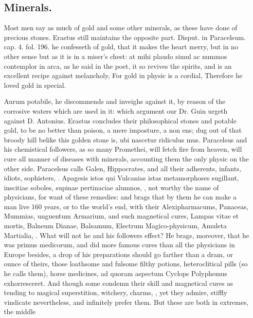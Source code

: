 {\subsection{Minerals.}
Most men say as much of gold and some other minerals, as
these have done of precious stones. Erastus still maintains the
opposite part. Disput. in Paracelsum. cap. 4. fol. 196. he confesseth
of gold,  that it makes the heart merry, but in no other sense
but as it is in a miser's chest: at mihi plaudo simul ac nummos
contemplor in arca, as he said in the poet, it so revives the spirits,
and is an excellent recipe against melancholy,
For gold in physic is a cordial,
Therefore he loved gold in special.

Aurum potabile, he discommends and inveighs against it, by reason
of the corrosive waters which are used in it: which argument our Dr.
Guin urgeth against D. Antonius. Erastus concludes their
philosophical stones and potable gold, \etc{} to be no better than poison,
a mere imposture, a non ens; dug out of that broody hill belike this
golden stone is, ubi nascetur ridiculus mus. Paracelsus and his
chemistical followers, as so many Promethei, will fetch fire from
heaven, will cure all manner of diseases with minerals, accounting them
the only physic on the other side. Paracelsus calls Galen,
Hippocrates, and all their adherents, infants, idiots, sophisters, \etc{}.
Apagesis istos qui Vulcanias istas metamorphoses sugillant, inscitiae
soboles, supinae pertinaciae alumnos, \etc{}, not worthy the name of
physicians, for want of these remedies: and brags that by them he can
make a man live 160 years, or to the world's end, with their
Alexipharmacums, Panaceas, Mummias, unguentum Armarium, and such
magnetical cures, Lampas vitae et mortis, Balneum Dianae, Balsamum,
Electrum Magico-physicum, Amuleta Martialia, \etc{}. What will not he and
his followers effect? He brags, moreover, that he was primus medicorum,
and did more famous cures than all the physicians in Europe besides,
a drop of his preparations should go farther than a dram, or
ounce of theirs, those loathsome and fulsome filthy potions,
heteroclitical pills (so he calls them), horse medicines, ad quoram
aspectum Cyclops Polyphemus exhorresceret. And though some condemn
their skill and magnetical cures as tending to magical superstition,
witchery, charms, \etc{}, yet they admire, stiffly vindicate nevertheless,
and infinitely prefer them. But these are both in extremes, the middle
}
